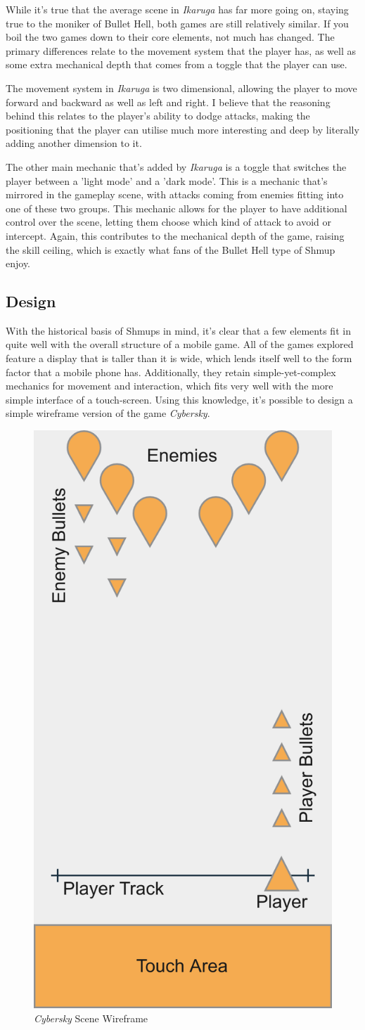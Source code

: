 \documentclass{scrartcl}
\begin{document}
While it's true that the average scene in \textit{Ikaruga} has far more going on, staying true to the moniker of Bullet Hell, both games are still relatively similar. If you boil the two games down to their core elements, not much has changed. The primary differences relate to the movement system that the player has, as well as some extra mechanical depth that comes from a toggle that the player can use.

The movement system in \textit{Ikaruga} is two dimensional, allowing the player to move forward and backward as well as left and right. I believe that the reasoning behind this relates to the player's ability to dodge attacks, making the positioning that the player can utilise much more interesting and deep by literally adding another dimension to it.

The other main mechanic that's added by \textit{Ikaruga} is a toggle that switches the player between a 'light mode' and a 'dark mode'. This is a mechanic that's mirrored in the gameplay scene, with attacks coming from enemies fitting into one of these two groups. This mechanic allows for the player to have additional control over the scene, letting them choose which kind of attack to avoid or intercept. Again, this contributes to the mechanical depth of the game, raising the skill ceiling, which is exactly what fans of the Bullet Hell type of Shmup enjoy.

\subsection{Design}

With the historical basis of Shmups in mind, it's clear that a few elements fit in quite well with the overall structure of a mobile game. All of the games explored feature a display that is taller than it is wide, which lends itself well to the form factor that a mobile phone has. Additionally, they retain simple-yet-complex mechanics for movement and interaction, which fits very well with the more simple interface of a touch-screen. Using this knowledge, it's possible to design a simple wireframe version of the game \textit{Cybersky}.

\begin{figure}[ht]
  \centering
  \includegraphics[width=.3\columnwidth]{concept1.png}
  \caption[\textit{Cybersky}]{\textit{Cybersky} Scene Wireframe}
\end{figure}
\end{document}
